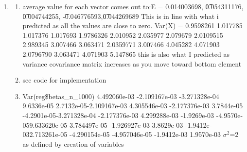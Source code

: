 \documentclass{article}
\begin{document}
	\maketitle
	\begin{enumerate}
		\item
			\begin{enumerate}
				\item
				\newpage
				
				average value for each vector comes out to:\newline E =  0.014003698, \t  0.054311176, \t 0.004744255, \t -0.046776593,\t  0.044269689
				\newline
				This is in line with what i predicted as all the values are close to zero.
				\newline \newline
				Var(X) =
				\newline           [,1]      [,2]     [,3]     [,4]     [,5] 0.9598261 1.017785 1.017376 1.017693 1.9786326 2.010952 2.035977 2.079679 2.0109515 2.989345 3.007466 3.063471 2.0359771 3.007466 4.045282 4.071903 2.0796790 3.063471 4.071903 5.147865\newline
				\newline
				this is also what I predicted as variance covariance matrix increases as you move toward bottom element
				\newline
				\item
				see code for implementation
				\item
				Var(reg\$betas\_n\_1000) \newline
				              [,1]          [,2]          [,3]          [,4]          [,5]\newline
				              [1,]  4.492060e-03 -2.109167e-03 -3.271328e-04  9.6336e-05  2.7132e-05\newline
				              [2,] -2.109167e-03  4.305546e-03 -2.177376e-03  3.7844e-05 -4.2901e-05\newline
				              [3,] -3.271328e-04 -2.177376e-03  4.299288e-03 -1.9269e-03 -4.9570e-05\newline
				              [4,]  9.633620e-05  3.784497e-05 -1.926927e-03  3.8629e-03 -1.9412e-03\newline
				              [5,]  2.713261e-05 -4.290154e-05 -4.957046e-05 -1.9412e-03  1.9570e-03\newline
				              \newline
				$\sigma^{2}$=2 as defined by creation of variables \newline
				

\end{enumerate}
\end{enumerate}
\end{document}
